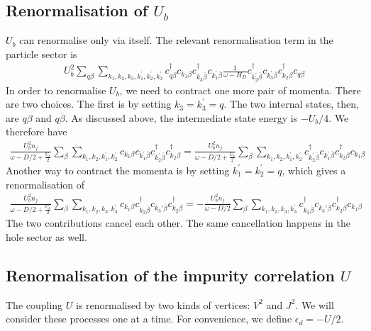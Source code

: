 \documentclass[reprint,superscriptaddress,floatfix]{revtex4-2}
\begin{document}
\begin{widetext}
\subsection{Renormalisation of \(U_b\)}
\(U_b\) can renormalise only via itself. The relevant renormalisation term in the particle sector is
\begin{equation}\begin{aligned}
	U_b^2 \sum_{q\beta}\sum_{k_1,k_2,k_3,k_1^\prime,k_2^\prime,k_3^\prime} c^\dagger_{q\beta}c_{k_1\beta}c^\dagger_{k_3\overline\beta}c_{k_1^\prime\overline\beta}\frac{1}{\omega - H_D}c^\dagger_{k_2^\prime\overline\beta}c_{k_3^\prime\overline\beta}c^\dagger_{k_2\beta}c_{q\beta}
\end{aligned}\end{equation}
In order to renormalise \(U_b\), we need to contract one more pair of momenta. There are two choices. The first is by setting \(k_3 = k_3^\prime = q\). The two internal states, then, are \(q\beta\) and \(q\overline\beta\). As discussed above, the intermediate state energy is \(-U_b/4\). We therefore have
\begin{equation}\begin{aligned}
	\frac{U_b^2 n_j}{\omega - D/2 + \frac{U_b}{2}}\sum_{\beta}\sum_{k_1,k_2,k_1^\prime,k_2^\prime} c_{k_1\beta}c_{k_1^\prime\overline\beta}c^\dagger_{k_2^\prime\overline\beta}c^\dagger_{k_2\beta} = \frac{U_b^2 n_j}{\omega - D/2 + \frac{U_b}{2}}\sum_{\beta}\sum_{k_1,k_2,k_1^\prime,k_2^\prime} c^\dagger_{k_2^\prime\overline\beta}c_{k_1^\prime\overline\beta}c^\dagger_{k_2\beta}c_{k_1\beta}
\end{aligned}\end{equation}
Another way to contract the momenta is by setting \(k_1^\prime = k_2^\prime = q\), which gives a renormalisation of
\begin{equation}\begin{aligned}
	\frac{U_b^2 n_j}{\omega - D/2 + \frac{U_b}{2}}\sum_{\beta}\sum_{k_1,k_2,k_3,k_3^\prime} c_{k_1\beta}c^\dagger_{k_3 \overline\beta}c_{k_3\prime\overline\beta}c^\dagger_{k_2\beta} = -\frac{U_b^2 n_j}{\omega - D/2}\sum_{\beta}\sum_{k_1,k_2,k_3,k_3^\prime} c^\dagger_{k_3 \overline\beta}c_{k_3\prime\overline\beta}c^\dagger_{k_2\beta}c_{k_1\beta}
\end{aligned}\end{equation}
The two contributions cancel each other. The same cancellation happens in the hole sector as well.



\subsection{Renormalisation of the impurity correlation \(U\)}
The coupling \(U\) is renormalised by two kinds of vertices: \(V^2\) and \(J^2\). We will consider these processes one at a time. For convenience, we define \(\epsilon_d = -U/2\).


\end{widetext}
\end{document}
